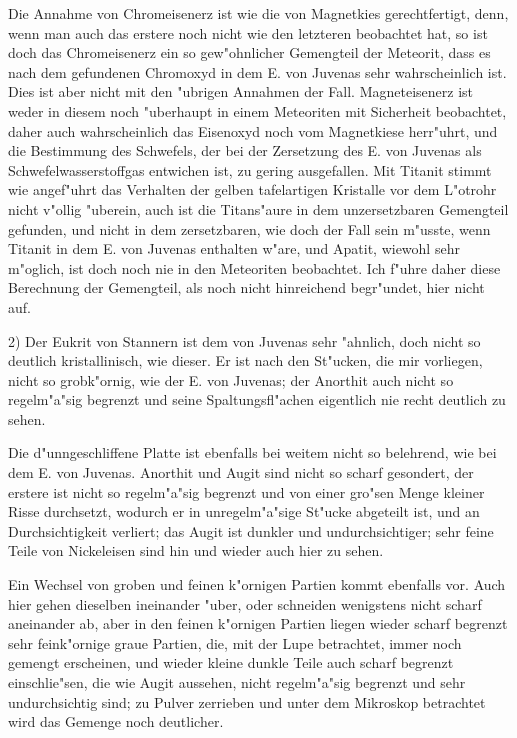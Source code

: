 \documentclass[a4paper, 11pt, oneside]{article}
\begin{document}
Die Annahme von Chromeisenerz ist wie die von Magnetkies gerechtfertigt, denn, wenn man auch das erstere noch nicht wie den letzteren beobachtet hat, so ist doch das Chromeisenerz ein so gew"ohnlicher Gemengteil der Meteorit, dass es nach dem gefundenen Chromoxyd in dem E. von Juvenas sehr wahrscheinlich ist. Dies ist aber nicht mit den "ubrigen Annahmen der Fall. Magneteisenerz ist weder in diesem noch "uberhaupt in einem Meteoriten mit Sicherheit beobachtet, daher auch wahrscheinlich das Eisenoxyd noch vom Magnetkiese herr"uhrt, und die Bestimmung des Schwefels, der bei der Zersetzung des E. von Juvenas als Schwefelwasserstoffgas entwichen ist, zu gering ausgefallen. Mit Titanit stimmt wie angef"uhrt das Verhalten der gelben tafelartigen Kristalle vor dem L"otrohr nicht v"ollig "uberein, auch ist die Titans"aure in dem unzersetzbaren Gemengteil gefunden, und nicht in dem zersetzbaren, wie doch der Fall sein m"usste, wenn Titanit in dem E. von Juvenas enthalten w"are, und Apatit, wiewohl sehr m"oglich, ist doch noch nie in den Meteoriten beobachtet. Ich f"uhre daher diese Berechnung der Gemengteil, als noch nicht hinreichend begr"undet, hier nicht auf.

2) Der Eukrit von Stannern ist dem von Juvenas sehr "ahnlich, doch nicht so deutlich kristallinisch, wie dieser. Er ist nach den St"ucken, die mir vorliegen, nicht so grobk"ornig, wie der E. von Juvenas; der Anorthit auch nicht so regelm"a"sig begrenzt und seine Spaltungsfl"achen eigentlich nie recht deutlich zu sehen.

Die d"unngeschliffene Platte ist ebenfalls bei weitem nicht so belehrend, wie bei dem E. von Juvenas. Anorthit und Augit sind nicht so scharf gesondert, der erstere ist nicht so regelm"a"sig begrenzt und von einer gro"sen Menge kleiner Risse durchsetzt, wodurch er in unregelm"a"sige St"ucke abgeteilt ist, und an Durchsichtigkeit verliert; das Augit ist dunkler und undurchsichtiger; sehr feine Teile von Nickeleisen sind hin und wieder auch hier zu sehen.

Ein Wechsel von groben und feinen k"ornigen Partien kommt ebenfalls vor. Auch hier gehen dieselben ineinander "uber, oder schneiden wenigstens nicht scharf aneinander ab, aber in den feinen k"ornigen Partien liegen wieder scharf begrenzt sehr feink"ornige graue Partien, die, mit der Lupe betrachtet, immer noch gemengt erscheinen, und wieder kleine dunkle Teile auch scharf begrenzt einschlie"sen, die wie Augit aussehen, nicht regelm"a"sig begrenzt und sehr undurchsichtig sind; zu Pulver zerrieben und unter dem Mikroskop betrachtet wird das Gemenge noch deutlicher.
\end{document}
